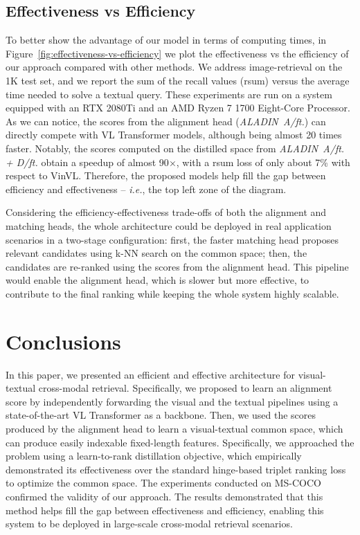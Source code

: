 \documentclass[sigconf]{acmart}
\def \ie {\emph{i.e.}}
\newcommand{\ourmodel}{ALADIN}    \settopmatter{authorsperrow=4}
\begin{document}
\subsection{Effectiveness vs Efficiency}
To better show the advantage of our model in terms of computing times, in Figure~\ref{fig:effectiveness-vs-efficiency} we plot the effectiveness vs the efficiency of our approach compared with other methods. We address image-retrieval on the 1K test set, and we report the sum of the recall values (rsum) versus the average time needed to solve a textual query. These experiments are run on a system equipped with an RTX 2080Ti and an AMD Ryzen 7 1700 Eight-Core Processor. As we can notice, the scores from the alignment head (\textit{\ourmodel\ A/ft.}) can directly compete with VL Transformer models, although being almost 20 times faster. Notably, the scores computed on the distilled space from \textit{\ourmodel\ A/ft. + D/ft.} obtain a speedup of almost 90$\times$, with a rsum loss of only about 7\% with respect to VinVL.
Therefore, the proposed models help fill the gap between efficiency and effectiveness -- \ie, the top left zone of the diagram.

Considering the efficiency-effectiveness trade-offs of both the alignment and matching heads, the whole architecture could be deployed in real application scenarios in a two-stage configuration: first, the faster matching head proposes relevant candidates using k-NN search on the common space; then, the candidates are re-ranked using the scores from the alignment head. This pipeline would enable the alignment head, which is slower but more effective, to contribute to the final ranking while keeping the whole system highly scalable.


 \section{Conclusions}
In this paper, we presented an efficient and effective architecture for visual-textual cross-modal retrieval. Specifically, we proposed to learn an alignment score by independently forwarding the visual and the textual pipelines using a state-of-the-art VL Transformer as a backbone. Then, we used the scores produced by the alignment head to learn a visual-textual common space, which can produce easily indexable fixed-length features. Specifically, we approached the problem using a learn-to-rank distillation objective, which empirically demonstrated its effectiveness over the standard hinge-based triplet ranking loss to optimize the common space. The experiments conducted on MS-COCO confirmed the validity of our approach. The results demonstrated that this method helps fill the gap between effectiveness and efficiency, enabling this system to be deployed in large-scale cross-modal retrieval scenarios. 
\end{document}
